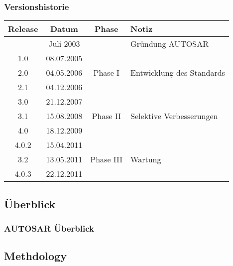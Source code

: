 \documentclass[]{beamer}
\newcommand{\inputImage}[1]{}
\begin{document}
\begin{frame}
\frametitle{Versionshistorie}
    \begin{table}[h]
        \centering
        \begin{tabular}[h]{c c c l}
            \toprule
            Release & Datum & Phase & Notiz\\
            \midrule
                  & Juli 2003  &  & Gründung AUTOSAR\\
            \midrule
            1.0   & 08.07.2005 & \multirow{3}{*}{Phase I} & \\
            2.0	  & 04.05.2006 &  & Entwicklung des Standards\\
            2.1	  & 04.12.2006 &  & \\
            \midrule
            3.0	  & 21.12.2007 & \multirow{3}{*}{Phase II} & \\
            3.1	  & 15.08.2008 &  & Selektive Verbesserungen\\
            4.0	  & 18.12.2009 &  & \\
            \midrule
            4.0.2 & 15.04.2011 & \multirow{3}{*}{Phase III} & \\
            3.2	  & 13.05.2011 &  & Wartung\\
            4.0.3 & 22.12.2011 &  & \\
            \bottomrule
        \end{tabular}
        \label{tab:timeline}
    \end{table}
\end{frame}

\subsection{Überblick}
\label{sec:überblick}

\begin{frame}[plain]
\frametitle{AUTOSAR Überblick}
    \begin{figure}[ht]
        \centering
        \resizebox{0.6\linewidth}{!}{\inputImage{autosar_overview.dia}}
        \label{fig:autosar_overview}
    \end{figure}
\end{frame}

\subsection{Methdology}
\label{sec:methodology}
\end{document}
